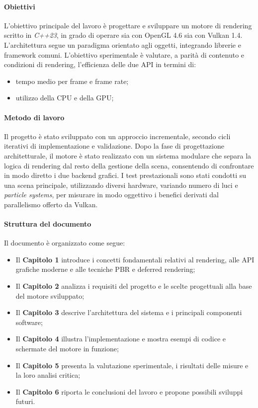 \documentclass[12pt,a4paper,openright,twoside]{book}
\begin{document}
\paragraph{Obiettivi}
L’obiettivo principale del lavoro è progettare e sviluppare un motore di rendering scritto in \emph{C++23},
in grado di operare sia con OpenGL 4.6 sia con Vulkan 1.4.
L’architettura segue un paradigma orientato agli oggetti, integrando librerie e framework comuni.
L’obiettivo sperimentale è valutare, a parità di contenuto e condizioni di rendering, l’efficienza delle due API 
in termini di:
\begin{itemize}
    \item tempo medio per frame e frame rate;
    \item utilizzo della CPU e della GPU;
\end{itemize}

\paragraph{Metodo di lavoro}
Il progetto è stato sviluppato con un approccio incrementale, secondo cicli iterativi di implementazione e validazione.  
Dopo la fase di progettazione architetturale, il motore è stato realizzato con un sistema modulare che separa la logica 
di rendering dal resto della gestione della scena, consentendo di confrontare in modo diretto i due backend grafici.  
I test prestazionali sono stati condotti su una scena principale, utilizzando diversi hardware, variando numero di luci 
e \emph{particle systems}, per misurare in modo oggettivo i benefici derivati dal parallelismo offerto da Vulkan.

\paragraph{Struttura del documento}
Il documento è organizzato come segue:
\begin{itemize}
   \item Il \textbf{Capitolo 1} introduce i concetti fondamentali relativi al rendering, alle \ac{API} grafiche moderne e alle tecniche \ac{PBR} e deferred rendering;
   \item Il \textbf{Capitolo 2} analizza i requisiti del progetto e le scelte progettuali alla base del motore sviluppato;
   \item Il \textbf{Capitolo 3} descrive l’architettura del sistema e i principali componenti software;
   \item Il \textbf{Capitolo 4} illustra l’implementazione e mostra esempi di codice e schermate del motore in funzione;
   \item Il \textbf{Capitolo 5} presenta la valutazione sperimentale, i risultati delle misure e la loro analisi critica;
   \item Il \textbf{Capitolo 6} riporta le conclusioni del lavoro e propone possibili sviluppi futuri.
\end{itemize}
\end{document}
